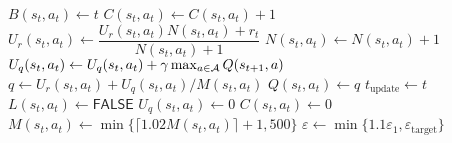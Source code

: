 \begin{algorithm}[h!]
\begin{algorithmic}
     \alsp
         \alsp
            \STATE $B(s_t,a_t)\leftarrow t$ \alsp
        \ENDIF
        \STATE $C(s_t,a_t) \leftarrow C(s_t,a_t) + 1$ \alsp
        \STATE $U_r(s_t,a_t) \leftarrow \dfrac{U_r(s_t, a_t)N(s_t,a_t) + r_t}{N(s_t, a_t)+1}$ \alsp
        \STATE $N(s_t, a_t) \leftarrow N(s_t, a_t) + 1$ \alsp
        \STATE $U_q(s_t, a_t) \leftarrow U_q(s_t, a_t) + \gamma \max_{a\in {\mathcal A}} Q(s_{t+1}, a)$   \alsp
         \alsp
            \STATE $q \leftarrow U_r(s_t, a_t) + U_q(s_t, a_t)/M(s_t,a_t)$ \alsp
             \alsp
                \STATE $Q(s_t,a_t) \leftarrow q$ \alsp  \qquad{}
                \STATE $t_{\textrm{update}} \leftarrow t$ \alsp
             \alsp
                \STATE $L(s_t,a_t) \leftarrow \textsf{FALSE}$ \alsp
            \ENDIF
            \STATE $U_q(s_t,a_t) \leftarrow 0$ \alsp
            \STATE $C(s_t, a_t) \leftarrow 0$ \alsp
            \STATE $M(s_t, a_t) \leftarrow \min\{\lceil 1.02M(s_t,a_t)\rceil +1, 500\}$ \alsp  \qquad{}
            \STATE $\varepsilon \leftarrow \min \{1.1\varepsilon_1, \varepsilon_{\mathrm{target}}\}$ \alsp  \qquad\qquad\qquad{}
        \ENDIF
    \ENDIF
   \ENDFOR             

\end{algorithmic}
\end{algorithm}


